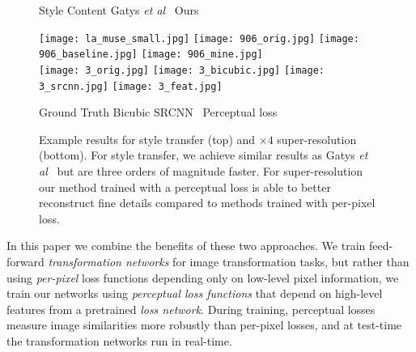 \documentclass[runningheads]{llncs}
\newcommand{\etal}{\textit{et al}}
\begin{document}
\begin{figure}[t]
  \hspace{20mm} Style
  \hspace{15.5mm} Content
  \hspace{5.5mm} Gatys \etal~\cite{gatys2015neural}
  \hspace{6.5mm} Ours
  \vspace{-2.5mm}
  \begin{center}
    \texttt{[image: la\_muse\_small.jpg]}
    \texttt{[image: 906\_orig.jpg]}
    \texttt{[image: 906\_baseline.jpg]}
    \texttt{[image: 906\_mine.jpg]} \\
    \vspace{1mm}
    \texttt{[image: 3\_orig.jpg]}
    \texttt{[image: 3\_bicubic.jpg]}
    \texttt{[image: 3\_srcnn.jpg]}
    \texttt{[image: 3\_feat.jpg]}
  \end{center}
  \vspace{-3mm}
  \hspace{14mm} Ground Truth
  \hspace{7mm} Bicubic
  \hspace{8mm} SRCNN~\cite{dong2014learning}
  \hspace{2mm} Perceptual loss
  \vspace{-1mm}
  \caption{Example results for style transfer (top) and $\times 4$ super-resolution
    (bottom). For style transfer, we achieve similar results as Gatys \etal~\cite{gatys2015neural}
    but are three orders of magnitude faster. For super-resolution our method trained with a
    perceptual loss is able to better reconstruct fine details compared to methods trained with
    per-pixel loss.
  }
  \vspace{-5mm}
\end{figure}

In this paper we combine the benefits of these two approaches.
We train feed-forward \emph{transformation networks} for image transformation tasks,
but rather than using \emph{per-pixel} loss functions depending only on low-level pixel
information, we train our networks using \emph{perceptual loss functions} that depend
on high-level features from a pretrained \emph{loss network}. During training, perceptual
losses measure image similarities more robustly than per-pixel losses, and at test-time
the transformation networks run in real-time.
\end{document}
